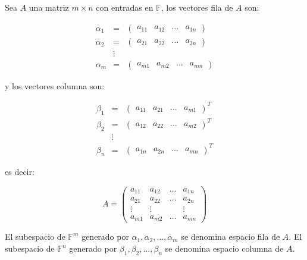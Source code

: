 		\begin{definicion}
			Sea $A$ una matriz $m \times n$ con entradas en $\mathbb{F}$, los vectores fila de $A$ son:

			\begin{eqnarray*}
				\alpha_1 & = & \begin{pmatrix} a_{11} & a_{12} & \dots & a_{1n} \end{pmatrix} \\
				\alpha_2 & = & \begin{pmatrix} a_{21} & a_{22} & \dots & a_{2n} \end{pmatrix} \\
				& \vdots & \\
				\alpha_m & = & \begin{pmatrix} a_{m1} & a_{m2} & \dots & a_{mn} \end{pmatrix}
			\end{eqnarray*}

			y los vectores columna son:

			\begin{eqnarray*}
				\beta_1 & = & \begin{pmatrix} a_{11} & a_{21} & \dots & a_{m1} \end{pmatrix}^T \\
				\beta_2 & = & \begin{pmatrix} a_{12} & a_{22} & \dots & a_{m2} \end{pmatrix}^T \\
				& \vdots & \\
				\beta_n & = & \begin{pmatrix} a_{1n} & a_{2n} & \dots & a_{mn} \end{pmatrix}^T
			\end{eqnarray*}

			es decir:

			\begin{equation*}
				A =
				\begin{pmatrix}
					a_{11} & a_{12} & \dots & a_{1n} \\
					a_{21} & a_{22} & \dots & a_{2n} \\
					\vdots & \vdots & & \vdots \\
					a_{m1} & a_{m2} & \dots & a_{mn}
				\end{pmatrix}
			\end{equation*}

			El subespacio de $\mathbb{F}^m$ generado por $\alpha_1, \alpha_2, \dots, \alpha_m$ se denomina espacio fila de $A$.
			El subespacio de $\mathbb{F}^n$ generado por $\beta_1, \beta_2, \dots, \beta_n$ se denomina espacio columna de $A$.
		\end{definicion}

